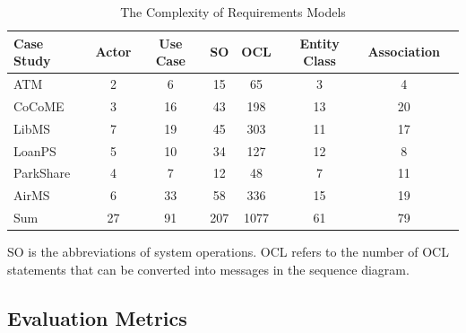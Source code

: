 \documentclass[pdflatex,sn-mathphys-num]{sn-jnl}%
\theoremstyle{thmstyleone}%
\theoremstyle{thmstyletwo}%
\theoremstyle{thmstylethree}%
\begin{document}
\begin{table}[!htb]
  \caption{The Complexity of Requirements Models}
  \label{Complexity}
  \centering
  \begin{threeparttable}
  \begin{tabular}{lccccccc}
    \toprule
    Case Study & Actor & Use Case & SO & OCL & Entity Class & Association \\
    \midrule
    ATM & 2 & 6 & 15 & 65 & 3 & 4 \\
    CoCoME & 3 & 16 & 43 & 198 & 13 & 20 \\
    LibMS & 7 & 19 & 45 & 303 & 11 & 17 \\
    LoanPS & 5 & 10 & 34 & 127 & 12 & 8 \\
    ParkShare & 4 & 7 & 12 &48  & 7 & 11 \\
    AirMS & 6 & 33 & 58 &336  & 15 & 19\\
    \midrule
    Sum & 27 & 91 & 207 & 1077 & 61 & 79 \\
  \bottomrule
  \end{tabular}
  
  \begin{tablenotes}[para]
  \footnotesize
         \item[*] SO is the abbreviations of system operations. OCL refers to the number of OCL statements that can be converted into messages in the sequence diagram.
  \end{tablenotes}
  
  \end{threeparttable}
\end{table}

\subsection{Evaluation Metrics}
\end{document}
